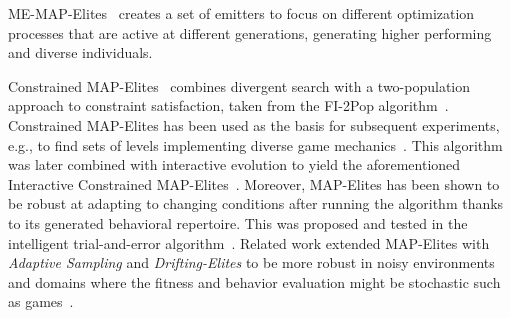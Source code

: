 ME-MAP-Elites~ creates a set of emitters to focus on different optimization processes that are active at different generations, generating higher performing and diverse individuals.%

Constrained MAP-Elites~
combines divergent search with a two-population approach to constraint satisfaction, taken from the FI-2Pop algorithm~. Constrained MAP-Elites has been used as the basis for subsequent experiments, e.g., to find sets of levels implementing diverse game mechanics~. This algorithm was later combined with interactive evolution to yield the aforementioned Interactive Constrained MAP-Elites~. %
Moreover, MAP-Elites has been shown to be robust at adapting to changing conditions after running the algorithm thanks to its generated behavioral repertoire. This was proposed and tested in the intelligent trial-and-error algorithm~. 
Related work extended MAP-Elites with \emph{Adaptive Sampling} and \emph{Drifting-Elites} to be more robust in noisy environments and domains where the fitness and behavior evaluation might be stochastic such as games~.





